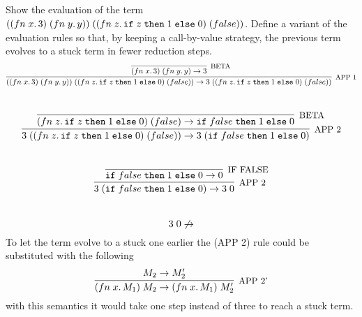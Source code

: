 \subsection{}

Show the evaluation of the term
$((fn\;x.\,3)\;(fn\;y.\,y))\;((fn\;z.\,\texttt{if}\;z\;\texttt{then}\;1\;\texttt{else}\;0)\;(false))$.
Define a variant of the evaluation rules so that, by keeping a call-by-value
strategy, the previous term evolves to a stuck term in fewer reduction steps.
\[
	\infer[\text{\small{APP 1}}]
	{
		\APP{(\APP{(\FN{x}{3})}{(\FN{y}{y})})}{(\APP{(\FN{z}{\IF{z}{1}{0}})}{(false)})} \to
		\APP{3}{(\APP{(\FN{z}{\IF{z}{1}{0}})}{(false)})}
	}
	{
		\infer[\text{\small{BETA}}]
		{
			\APP{(\FN{x}{3})}{(\FN{y}{y})} \to 3
		}
		{}
	}
\]
\\
\[
	\infer[\text{\small{APP 2}}]
	{
		\APP{3}{(\APP{(\FN{z}{\IF{z}{1}{0}})}{(false)})} \to
		\APP{3}{(\IF{false}{1}{0})}
	}
	{
		\infer[\text{\small{BETA}}]
		{
			\APP{(\FN{z}{\IF{z}{1}{0}})}{(false)} \to \IF{false}{1}{0}
		}
		{}
	}
\]
\\
\[
	\infer[\text{\small{APP 2}}]
	{
		\APP{3}{(\IF{false}{1}{0})} \to
		\APP{3}{0}
	}
	{
		\infer[\text{\small{IF FALSE}}]
		{
			\IF{false}{1}{0} \to 0
		}
		{}
	}
\]
\\
\[
	3\;0 \not\to
\]
To let the term evolve to a stuck one earlier the (APP 2) rule could be substituted with the following
\[
	\infer[\text{\small{APP 2'}}]
	{
		\APP{(\FN{x}{M_1})}{M_2} \to \APP{(\FN{x}{M_1})}{M_2'}
	}
	{M_2 \to M_2'}
\]
with this semantics it would take one step instead of three to reach a stuck term.
